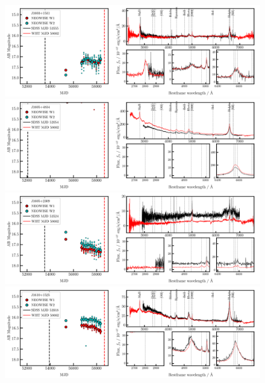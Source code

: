 \documentclass[a4paper,fleqn,usenatbib]{mnras}
\begin{document}
\begin{figure}
  \centering
  \includegraphics[width=16.7cm, trim=0.0cm 0.05cm 0.2cm 0.1cm, clip]
  {../plots/LCs_and_spectra/J1603+1531_landscape_temp.png}  
  \includegraphics[width=16.7cm, trim=0.0cm 0.05cm 0.2cm 0.1cm, clip]
  {../plots/LCs_and_spectra/J1605+4834_landscape_temp.png}
  \includegraphics[width=16.7cm, trim=0.0cm 0.05cm 0.2cm 0.1cm, clip]
  {../plots/LCs_and_spectra/J1605+2309_landscape_temp.png}
  \includegraphics[width=16.7cm, trim=0.0cm 0.05cm 0.2cm 0.1cm, clip]
  {../plots/LCs_and_spectra/J1610+1525_landscape_temp.png}
    \vspace{-12pt}
  \caption[]{}
  \label{fig:all_spectra_b}
\end{figure}
\end{document}
